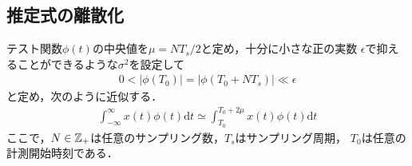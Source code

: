 \documentclass[usejistfm]{sice}
\def\Z{{\Bbb Z}}
\begin{document}
\subsection{推定式の離散化}

テスト関数$\phi(t)$の中央値を$\mu=NT_s/2$と定め，十分に小さな正の実数
$\epsilon$で抑えることができるような$\sigma^2$を設定して
\begin{align}
0< \vert \phi(T_0) \vert=\vert \phi(T_0+NT_s)\vert\ll
\epsilon
\end{align}
と定め，次のように近似する．
\begin{align}
 \int^{\infty}_{-\infty}x(t)\phi(t)\mbox{d}t \simeq 
 \int^{T_0+2\mu}_{T_0}x(t)\phi(t)\mbox{d}t 
\label{eq:appro}
\end{align}
ここで，$N\in \Z_{+}$は任意のサンプリング数，$T_s$はサンプリング周期，
$T_0$は任意の計測開始時刻である．
\end{document}
